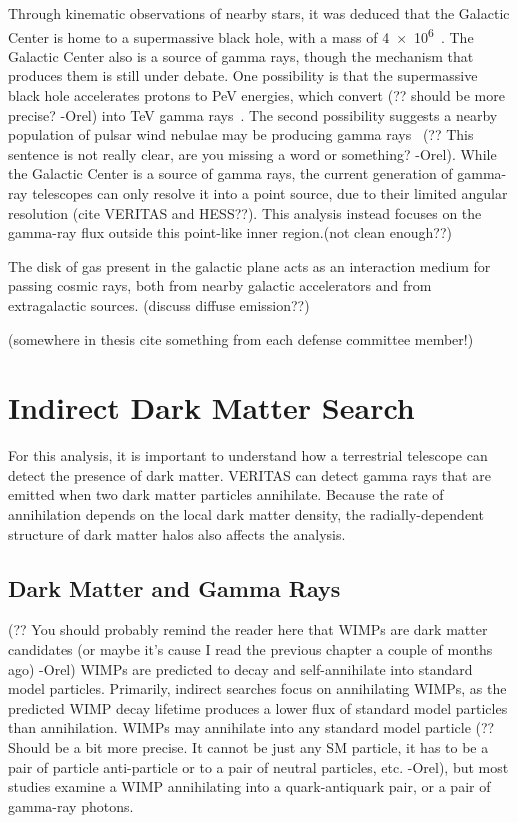   Through kinematic observations of nearby stars, it was deduced that the Galactic Center is home to a supermassive black hole, with a mass of \SI{4e6}{\Msol}~\cite{sgra_massdist}.
  The Galactic Center also is a source of \TeV{} gamma rays, though the mechanism that produces them is still under debate.
  One possibility is that the supermassive black hole accelerates protons to PeV energies, {\color{red}which convert (?? should be more precise? -Orel)} into TeV gamma rays~\cite{gc_pevatron}.
  The second possibility suggests a nearby population of pulsar wind nebulae {\color{red}may be producing gamma rays~\cite{gc_pulsars} (?? This sentence is not really clear, are you missing a word or something? -Orel)}.
  While the Galactic Center is a source of gamma rays, the current generation of gamma-ray telescopes can only resolve it into a point source, due to their limited angular resolution {\color{red}(cite VERITAS and HESS??)}.
  This analysis instead focuses on the gamma-ray flux outside this point-like inner region.{\color{red}(not clean enough??)}

  The disk of gas present in the galactic plane acts as an interaction medium for passing cosmic rays, both from nearby galactic accelerators and from extragalactic sources.
  {\color{red}(discuss diffuse emission??)}

  {\color{red}(somewhere in thesis cite something from each defense committee member!)}

\section{Indirect Dark Matter Search}
  For this analysis, it is important to understand how a terrestrial telescope can detect the presence of dark matter.
  VERITAS can detect gamma rays that are emitted when two dark matter particles annihilate.
  Because the rate of annihilation depends on the local dark matter density, the radially-dependent structure of dark matter halos also affects the analysis.

  \subsection{Dark Matter and Gamma Rays}
    {\color{red}(?? You should probably remind the reader here that WIMPs are dark matter candidates (or maybe it's cause I read the previous chapter a couple of months ago) -Orel) }
    WIMPs are predicted to decay and self-annihilate into standard model particles.
    Primarily, indirect searches focus on annihilating WIMPs, as the predicted WIMP decay lifetime produces a lower flux of standard model particles than annihilation.
    WIMPs may annihilate into {\color{red}any standard model particle (?? Should be a bit more precise. It cannot be just any SM particle, it has to be a pair of particle anti-particle or to a pair of neutral particles, etc. -Orel)}, but most studies examine a WIMP annihilating into a quark-antiquark pair, or a pair of gamma-ray photons.

